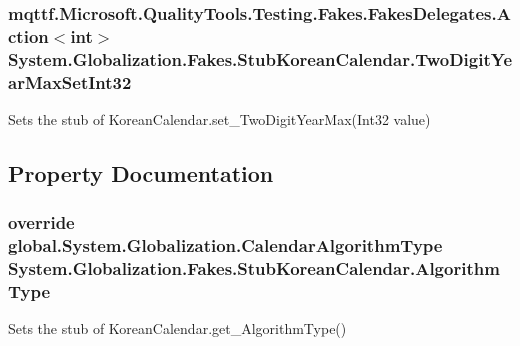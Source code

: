 \hypertarget{class_system_1_1_globalization_1_1_fakes_1_1_stub_korean_calendar_ae78a8d6c46fe7b404df05c846ef1750d}{
\subsubsection[{Two\-Digit\-Year\-Max\-Set\-Int32}]{\setlength{\rightskip}{0pt plus 5cm}mqttf.\-Microsoft.\-Quality\-Tools.\-Testing.\-Fakes.\-Fakes\-Delegates.\-Action$<$int$>$ System.\-Globalization.\-Fakes.\-Stub\-Korean\-Calendar.\-Two\-Digit\-Year\-Max\-Set\-Int32}}\label{class_system_1_1_globalization_1_1_fakes_1_1_stub_korean_calendar_ae78a8d6c46fe7b404df05c846ef1750d}


Sets the stub of Korean\-Calendar.\-set\-\_\-\-Two\-Digit\-Year\-Max(\-Int32 value)



\subsection{Property Documentation}
\hypertarget{class_system_1_1_globalization_1_1_fakes_1_1_stub_korean_calendar_aebcf05a35824d103031041ead5d313cb}{
\subsubsection[{Algorithm\-Type}]{\setlength{\rightskip}{0pt plus 5cm}override global.\-System.\-Globalization.\-Calendar\-Algorithm\-Type System.\-Globalization.\-Fakes.\-Stub\-Korean\-Calendar.\-Algorithm\-Type\hspace{0.3cm}{\ttfamily [get]}}}\label{class_system_1_1_globalization_1_1_fakes_1_1_stub_korean_calendar_aebcf05a35824d103031041ead5d313cb}


Sets the stub of Korean\-Calendar.\-get\-\_\-\-Algorithm\-Type()

